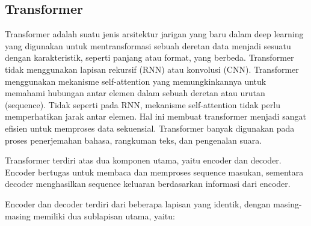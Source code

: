 \subsection{Transformer}
\label{subsec:transformer}

Transformer adalah suatu jenis arsitektur jarigan yang baru dalam deep learning yang digunakan untuk mentransformasi sebuah deretan data menjadi sesuatu dengan karakteristik, seperti panjang atau format, yang berbeda. Transformer tidak menggunakan lapisan rekursif (RNN) atau konvolusi (CNN).  Transformer menggunakan mekanisme self-attention yang memungkinkannya
untuk memahami hubungan antar elemen dalam sebuah deretan atau urutan
(sequence). Tidak seperti pada RNN, mekanisme self-attention tidak perlu
memperhatikan jarak antar elemen. Hal ini membuat transformer menjadi sangat efisien untuk memproses data sekuensial. Transformer banyak digunakan pada proses penerjemahan bahasa, rangkuman teks, dan pengenalan suara.

Transformer terdiri atas dua komponen utama, yaitu encoder dan decoder. Encoder bertugas untuk membaca dan memproses sequence masukan, sementara decoder menghasilkan sequence keluaran berdasarkan informasi dari encoder.

Encoder dan decoder terdiri dari beberapa lapisan yang identik, dengan
masing-masing memiliki dua sublapisan utama, yaitu:
